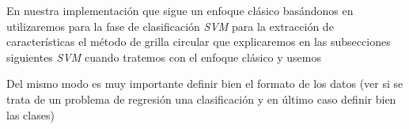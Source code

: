 En nuestra implementación que sigue un enfoque clásico basándonos en \cite{tesis-parodi} utilizaremos para la fase de clasificación \textit{SVM} para la extracción de características el método de grilla circular que explicaremos en las subsecciones siguientes \textit{SVM} cuando tratemos con el enfoque clásico y usemos 

Del mismo modo es muy importante definir bien el formato de los datos (ver si se trata de un problema de regresión una clasificación y en último caso definir bien las clases)

